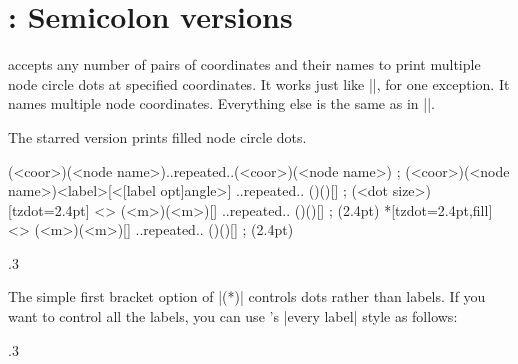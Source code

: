 \section{\protect\cmd{\tznodedots(*)}: Semicolon versions}
\label{s:tznodedots}

\icmd{\tznodedots} accepts any number of  pairs of coordinates and their names to print multiple node circle dots at specified coordinates.
It works just like |\tzdots|, for one exception. It names multiple node coordinates.
Everything else is the same as in |\tzdots|.

The starred version \icmd{\tznodedots*} prints filled node circle dots.

\begin{tzdef}{}
\tznodedots(<coor>)(<node name>)..repeated..(<coor>)(<node name>) ;
           (<coor>)(<node name>){<label>}[<[label opt]angle>]
                                        ..repeated.. ()(){}[] ; (<dot size>)
  [tzdot=2.4pt]     <> (<m>)(<m>){}[] ..repeated.. ()(){}[] ; (2.4pt)
 *[tzdot=2.4pt,fill]<> (<m>)(<m>){}[] ..repeated.. ()(){}[] ; (2.4pt)
\end{tzdef}



\begin{tzcode}{.3}
\end{tzcode}



The simple first bracket option of |\tznodedots(*)| controls dots rather than labels.
If you want to control all the labels, you can use \Tikz's |every label| style as follows:

\begin{tzcode}{.3}
\end{tzcode}



